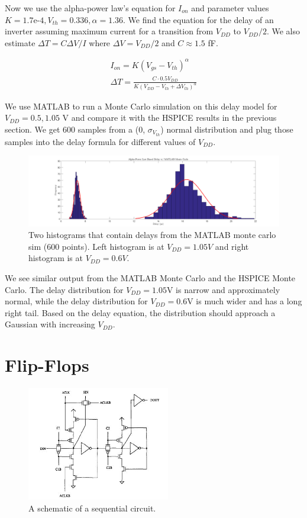 \documentclass[11pt]{article}
\begin{document}
Now we use the alpha-power law's equation for $I_{on}$ and parameter values $K = 1.7\text{e-4}, V_{th} = 0.336, \alpha = 1.36$. We find the equation for the delay of an inverter assuming maximum current for a transition from $V_{DD}$ to $V_{DD}/2$. We also estimate $\Delta T = C \Delta V / I$ where $\Delta V = V_{DD} / 2$ and $C \approx 1.5$ fF.

\begin{eqnarray}
	I_{on} = K (V_{gs} - V_{th}) ^ \alpha \nonumber \\
	\Delta T = \frac{C \cdot 0.5 V_{DD}}{K (V_{DD} - V_{th} + \Delta V_{th}) ^ \alpha} \nonumber
\end{eqnarray}

We use MATLAB to run a Monte Carlo simulation on this delay model for $V_{DD} = 0.5, 1.05$ V and compare it with the HSPICE results in the previous section. We get 600 samples from a (0, $\sigma_{V_{th}}$) normal distribution and plug those samples into the delay formula for different values of $V_{DD}$.

\begin{figure}[H]
	\centerline{\includegraphics[width=\textwidth+4cm]{delay_histograms_matlab.png}}
	\caption{Two histograms that contain delays from the MATLAB monte carlo sim (600 points). Left histogram is at $V_{DD} = 1.05V$ and right histogram is at $V_{DD} = 0.6V$.}
\end{figure}

We see similar output from the MATLAB Monte Carlo and the HSPICE Monte Carlo. The delay distribution for $V_{DD} = 1.05$V is narrow and approximately normal, while the delay distribution for $V_{DD} = 0.6$V is much wider and has a long right tail. Based on the delay equation, the distribution should approach a Gaussian with increasing $V_{DD}$.

\section{Flip-Flops}
\begin{figure}[H]
	\centerline{\includegraphics[height=5cm]{flip_flop_schematic.jpg}}
	\caption{A schematic of a sequential circuit.}
\end{figure}
\end{document}
